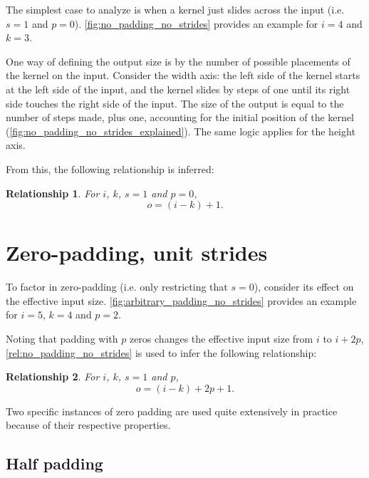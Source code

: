 \documentclass{report}
\newtheorem{relationship}{Relationship}
\begin{document}
The simplest case to analyze is when a kernel just slides across the input (i.e.
$s = 1$ and $p = 0$). \autoref{fig:no_padding_no_strides} provides an example
for $i = 4$ and $k = 3$.

One way of defining the output size is by the number of possible placements of
the kernel on the input. Consider the width axis: the left side of the kernel
starts at the left side of the input, and the kernel slides by steps of one
until its right side touches the right side of the input. The size of the output
is equal to the number of steps made, plus one, accounting for the initial
position of the kernel (\autoref{fig:no_padding_no_strides_explained}). The same
logic applies for the height axis.

From this, the following relationship is inferred:

\begin{relationship}\label{rel:no_padding_no_strides}
For $i$, $k$, $s = 1$ and $p = 0$,
\begin{equation*}
    o = (i - k) + 1.
\end{equation*}
\end{relationship}

\section{Zero-padding, unit strides}

To factor in zero-padding (i.e. only restricting that $s = 0$), consider its
effect on the effective input size. \autoref{fig:arbitrary_padding_no_strides}
provides an example for $i = 5$, $k = 4$ and $p = 2$.

Noting that padding with $p$ zeros changes the effective input size from $i$ to
$i + 2p$, \autoref{rel:no_padding_no_strides} is used to infer the following
relationship:

\begin{relationship}\label{rel:arbitrary_padding_no_strides}
For $i$, $k$, $s = 1$ and $p$,
\begin{equation*}
    o = (i - k) + 2p + 1.
\end{equation*}
\end{relationship}

Two specific instances of zero padding are used quite extensively in practice
because of their respective properties.

\subsection{Half padding}
\end{document}
